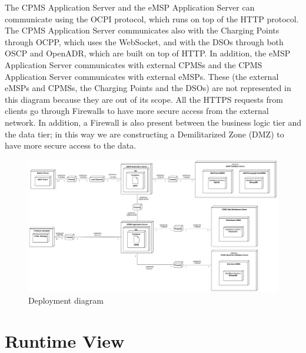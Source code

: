 \documentclass{Configuration_Files/PoliMi3i_thesis}
\begin{document}
The CPMS Application Server and the eMSP Application Server can communicate using the OCPI protocol, which runs on top of the HTTP protocol. The CPMS Application Server communicates also with the Charging Points through OCPP, which uses the WebSocket, and with the DSOs through both OSCP and OpenADR, which are built on top of HTTP. In addition, the eMSP Application Server communicates with external CPMSs and the CPMS Application Server communicates with external eMSPs. These (the external eMSPs and CPMSs, the Charging Points and the DSOs) are not represented in this diagram because they are out of its scope.
All the HTTPS requests from clients go through Firewalls to have more secure access from the external network. In addition, a Firewall is also present between the business logic tier and the data tier; in this way we are constructing a Demilitarized Zone (DMZ) to have more secure access to the data.

\begin{figure}[H]
    \centering
    \includegraphics[width=1\textwidth]{Images/deployment/DeploymentDiagram.jpg}
    \caption{Deployment diagram}
    \label{fig:deploy}
\end{figure}

\newpage
\section{Runtime View}
\end{document}
